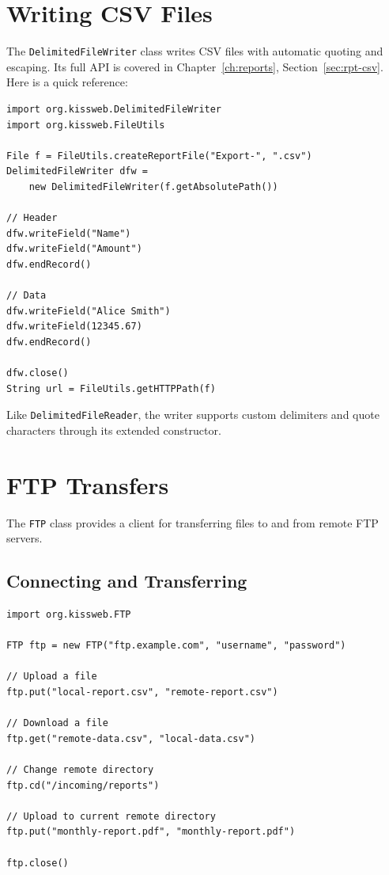 \section{Writing CSV Files}
\label{sec:file-csv-write}

The \texttt{DelimitedFileWriter} class writes CSV files with automatic quoting and escaping.  Its full API is covered in Chapter~\ref{ch:reports}, Section~\ref{sec:rpt-csv}.  Here is a quick reference:

\begin{lstlisting}[style=groovy]
import org.kissweb.DelimitedFileWriter
import org.kissweb.FileUtils

File f = FileUtils.createReportFile("Export-", ".csv")
DelimitedFileWriter dfw =
    new DelimitedFileWriter(f.getAbsolutePath())

// Header
dfw.writeField("Name")
dfw.writeField("Amount")
dfw.endRecord()

// Data
dfw.writeField("Alice Smith")
dfw.writeField(12345.67)
dfw.endRecord()

dfw.close()
String url = FileUtils.getHTTPPath(f)
\end{lstlisting}

\noindent
Like \texttt{DelimitedFileReader}, the writer supports custom delimiters and quote characters through its extended constructor.

\section{FTP Transfers}
\label{sec:file-ftp}

The \texttt{FTP} class provides a client for transferring files to and from remote FTP servers.

\subsection{Connecting and Transferring}

\begin{lstlisting}[style=groovy]
import org.kissweb.FTP

FTP ftp = new FTP("ftp.example.com", "username", "password")

// Upload a file
ftp.put("local-report.csv", "remote-report.csv")

// Download a file
ftp.get("remote-data.csv", "local-data.csv")

// Change remote directory
ftp.cd("/incoming/reports")

// Upload to current remote directory
ftp.put("monthly-report.pdf", "monthly-report.pdf")

ftp.close()
\end{lstlisting}

